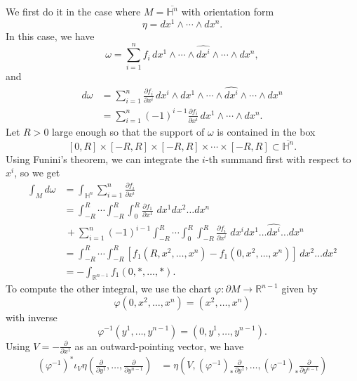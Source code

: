 \documentclass{ximera}
\begin{document}
\begin{solution}
    We first do it in the case where $M = \overline{\mathbb{H}^n}$ with orientation form
    \[   \eta = dx^1 \wedge \cdots \wedge dx^n .            \] 
    In this case, we have 
    \[    \omega = \sum_{i = 1} ^n  f_i  \, dx^1 \wedge \cdots \wedge \widehat{dx^i} \wedge \cdots  \wedge dx^n    ,      \]
    and 
    \begin{align*}
         d \omega & = \sum _{i = 1} ^n \frac{\partial f_i}{\partial x^i} \, dx^i \wedge dx^1 \wedge \cdots \wedge \widehat{dx^i} \wedge \cdots \wedge dx^n         \\
         & =  \sum _{i = 1} ^n (-1 )^{i-1} \frac{\partial f_i}{\partial x^i} \,   dx^1  \wedge \cdots \wedge dx^n .
    \end{align*}
    Let $R > 0 $ large enough so that the support of $\omega$ is contained in the box
    \[     [ 0 , R ] \times [-R , R ] \times [-R , R ] \times \cdots \times [-R,R]  \subset \overline{\mathbb{H}^n} .                 \]
    Using Funini's theorem, we can integrate the $i$-th summand first with respect to $x^i$, so we get
    \begin{align*}
        \int_M d \omega & = \int_{\mathbb{H}^n} \sum _{i = 1} ^n  \frac{\partial f_i}{\partial x^ i} \\
        & = \int_{-R } ^R \cdots \int_{-R}^R\int_{0 } ^R \frac{\partial f_1}{\partial x^1} \,\, dx^1 dx^2 \ldots dx^n  \\
        & \, + \sum _{i = 1} ^n (-1 )^{i-1} \int _{-R}^R \cdots \int_{0 } ^R \int_{-R}^R \frac{\partial f_i}{\partial x^i}\,\, dx^i dx^1 \ldots \widehat{dx^i} \ldots dx^n \\
        & = \int_{-R}^R \cdots \int_{-R}^R [f_1 (R,x^2, \ldots , x^n) - f_1(0,x^2, \ldots , x^n)] \, dx^2 \ldots dx^2 \\
        & = - \int_{\mathbb{R}^{n-1}} f_1 ( 0, \ast , \ldots , \ast )  .
    \end{align*}
    To compute the other integral, we use the chart $\varphi : \partial M \to \mathbb{R}^{n-1}$ given by 
    \[   \varphi (0, x^2, \ldots , x^n) = (x^2, \ldots , x^n)                \]
    with inverse
    \[   \varphi ^{-1} (y^1, \ldots , y^{n-1}) = (0, y^1 , \ldots , y^{n-1} )  .              \]
    Using $V = - \tfrac{\partial}{\partial x^1}$ as an outward-pointing vector, we have
    \begin{align*}
     ( \varphi ^{-1}) ^{\ast} \iota _V \eta ( \tfrac{\partial}{\partial y^1} , \ldots ,  \tfrac{\partial}{\partial y^{n-1}} )  & =  \eta ( V , ( \varphi ^{-1} ) _{\ast} \tfrac{\partial }{\partial y ^1} , \ldots ,  ( \varphi ^{-1} ) _{\ast} \tfrac{\partial }{\partial y ^{n-1}}   )  \\

\end{align*}
\end{solution}
\end{document}

